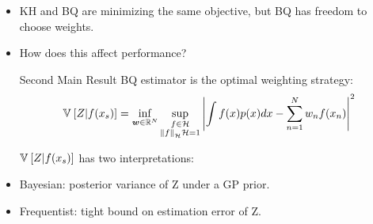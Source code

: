 \documentclass[usenames,dvipsnames]{beamer}
\begin{document}
\begin{frame}[plain, t]
	\titlebodyskip
	\slidebody
	{
\begin{itemize}
		\item KH and BQ are minimizing the same objective, but BQ has freedom to choose weights.%
		\pause
		\item How does this affect performance?
	    \pause 

	\begin{block}{Second Main Result}
	BQ estimator is the optimal weighting strategy:
\begin{align*}
\mathbb{V}_{} \left[ {Z\vert f(x_s)} \right] = \inf_{\bm{w}\in\mathbb{R}^N} \sup_{\substack{f\in\mathcal{H}\\\left\|f\right\|_{\mathcal{H}}{\mathcal{H}}=1}} \left| \int f(x) p(x) dx - \sum_{n=1}^{N}w_n 	f(x_n)\right|^2
\end{align*}
\end{block}
\pause

$\mathbb{V}_{} \left[ {Z\vert f(x_s)} \right]$ has two interpretations:
\item Bayesian: posterior variance of Z under a GP prior.
\item Frequentist: tight bound on estimation error of Z.
\end{itemize}
	}

	
\end{frame}
\end{document}
